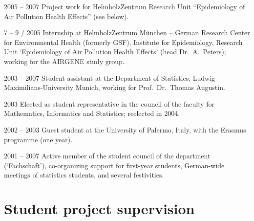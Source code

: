\documentclass[a4paper]{simplecv}
\begin{document}
\begin{topic}
\item[2005 -- 2007] Project work for HelmholzZentrum Research Unit ``Epidemiology of Air Pollution Health Effects'' (see below).

\item[7 -- 9 / 2005] Internship at HelmholzZentrum M\"unchen -- German Research Center for Environmental Health (formerly GSF),
Institute for Epidemiology, Research Unit `Epidemiology of Air Pollution Health Effects' (head Dr.\ A.\ Peters);
working for the AIRGENE study group.

\item[2003 -- 2007] Student assistant at the Department of Statistics, Ludwig-Maximi\-li\-ans-Uni\-ver\-si\-ty Munich,
working for Prof.\ Dr.\ Thomas Augustin.

\item[2003] Elected as student representative in the council of the faculty for Mathematics, Informatics and Statistics; reelected in 2004.

\item[2002 -- 2003] Guest student at the University of Palermo, Italy, with the Erasmus programme (one year). %

\item[2001 -- 2007] Active member of the student council of the department (`Fachschaft'),
co-organizing support for first-year students, German-wide meetings of statistics students, and several festivities.

\end{topic}


\section{Student project supervision}
\label{supervision}
\end{document}
